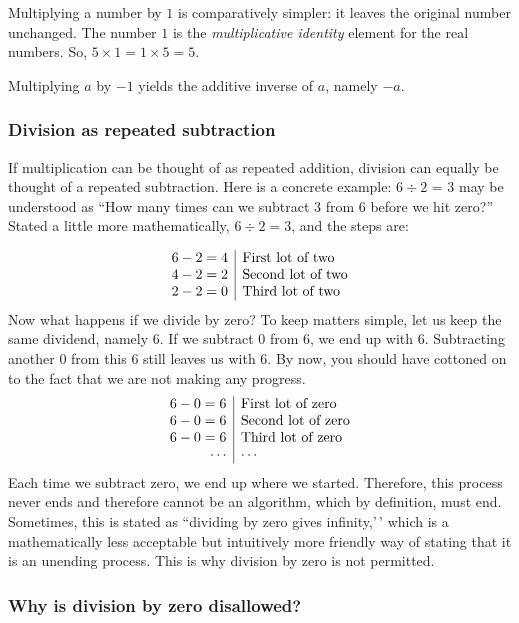 \documentclass[
  a4paper,
]{article}
\begin{document}
Multiplying a number by \(1\) is comparatively simpler: it leaves the
original number unchanged. The number \(1\) is the \emph{multiplicative
identity} element for the real numbers. So,
\(5 \times 1 = 1 \times 5 = 5\).

Multiplying \(a\) by \(-1\) yields the additive inverse of \(a\), namely
\(-a\).

\hypertarget{division-as-repeated-subtraction}{%
\subsubsection{Division as repeated
subtraction}\label{division-as-repeated-subtraction}}

If multiplication can be thought of as repeated addition, division can
equally be thought of a repeated subtraction. Here is a concrete
example: \(6 \div 2\) = 3 may be understood as ``How many times can we
subtract \(3\) from \(6\) before we hit zero?'' Stated a little more
mathematically, \(6 \div 2 = 3\), and the steps are:

\[
\begin{array}{r | l}
6 - 2 = 4 & \mbox{First lot of two}\\
4 - 2 = 2 & \mbox{Second lot of two}\\
2 - 2 = 0 & \mbox{Third lot of two}\\
\end{array}
\] Now what happens if we divide by zero? To keep matters simple, let us
keep the same dividend, namely 6. If we subtract 0 from 6, we end up
with 6. Subtracting another 0 from this 6 still leaves us with 6. By
now, you should have cottoned on to the fact that we are not making any
progress. \[
\begin{array}{r | l}
6 - 0 = 6 & \mbox{First lot of zero}\\
6 - 0 = 6 & \mbox{Second lot of zero}\\
6 - 0 = 6 & \mbox{Third lot of zero}\\
\cdots & \cdots\\
 \end{array}
\] Each time we subtract zero, we end up where we started. Therefore,
this process never ends and therefore cannot be an algorithm, which by
definition, must end. Sometimes, this is stated as ``dividing by zero
gives infinity,'\,' which is a mathematically less acceptable but
intuitively more friendly way of stating that it is an unending process.
This is why division by zero is not permitted.

\hypertarget{why-is-division-by-zero-disallowed}{%
\subsubsection{Why is division by zero
disallowed?}\label{why-is-division-by-zero-disallowed}}
\end{document}
